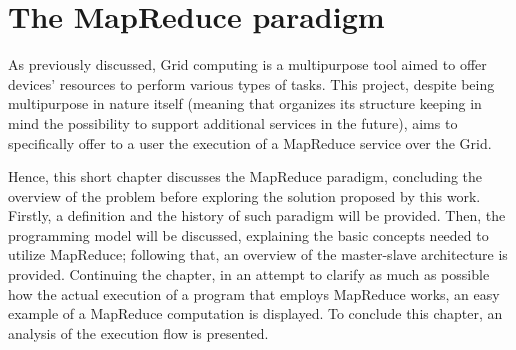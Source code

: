 \chapter{The MapReduce paradigm}\label{the_mapreduce_paradigm}
As previously discussed, Grid computing is a multipurpose tool aimed to offer devices' resources to perform various types of tasks. This project, despite being multipurpose in nature itself (meaning that organizes its structure keeping in mind the possibility to support additional services in the future), aims to specifically offer to a user the execution of a MapReduce service over the Grid.

Hence, this short chapter discusses the MapReduce paradigm, concluding the overview of the problem before exploring the solution proposed by this work. Firstly, a definition and the history of such paradigm will be provided. Then, the programming model will be discussed, explaining the basic concepts needed to utilize MapReduce; following that, an overview of the master-slave architecture is provided. Continuing the chapter, in an attempt to clarify as much as possible how the actual execution of a program that employs MapReduce works, an easy example of a MapReduce computation is displayed. To conclude this chapter, an analysis of the execution flow is presented.





